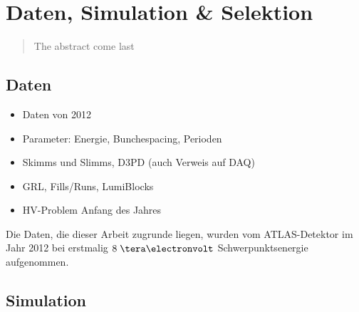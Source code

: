 


\chapter{Daten, Simulation \& Selektion}

\begin{quote}
    The abstract come last
\end{quote}



\section{Daten}
\label{data_sim_selection:data}

\begin{itemize}
    \item Daten von 2012
    \item Parameter: Energie, Bunchespacing, Perioden
    \item Skimms und Slimms, D3PD (auch Verweis auf DAQ)
    \item GRL, Fills/Runs, LumiBlocks
    \item HV-Problem Anfang des Jahres
\end{itemize}

Die Daten, die dieser Arbeit zugrunde liegen, wurden vom ATLAS-Detektor im Jahr
2012 bei erstmalig $8 \TeV$ Schwerpunktsenergie aufgenommen.




\section{Simulation}
\label{data_sim_selection:simulation}

